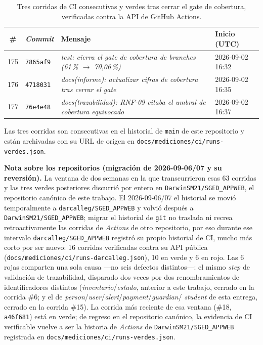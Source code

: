 \documentclass[11pt,a4paper]{article}
\newcommand{\ruta}[1]{\texttt{\footnotesize #1}}
\begin{document}
\begin{table}[htbp]
\centering
\caption{Tres corridas de CI consecutivas y verdes tras cerrar el gate de cobertura, verificadas contra la API de GitHub Actions.}
\label{tab:ci-corridas}
\begin{tabular}{@{}cp{2.1cm}p{6.8cm}p{3.3cm}@{}}
\toprule
\textbf{\#} & \textbf{\emph{Commit}} & \textbf{Mensaje} & \textbf{Inicio (UTC)} \\
\midrule
175 & \texttt{7865af9} & \emph{test: cierra el gate de cobertura de branches (61\,\% $\to$ 70,06\,\%)} & 2026-09-02 16:32 \\
176 & \texttt{4718031} & \emph{docs(informe): actualizar cifras de cobertura tras cerrar el gate} & 2026-09-02 16:35 \\
177 & \texttt{76e4e48} & \emph{docs(trazabilidad): RNF-09 citaba el umbral de cobertura equivocado} & 2026-09-02 16:37 \\
\bottomrule
\end{tabular}
\end{table}

Las tres corridas son consecutivas en el historial de \texttt{main} de
este repositorio y están archivadas con su URL de origen en
\ruta{docs/mediciones/ci/runs-verdes.json}.

\textbf{Nota sobre los repositorios (migración de 2026-09-06/07 y su
reversión).} La ventana de dos semanas en la que transcurrieron esas 63
corridas y las tres verdes posteriores discurrió por entero en
\texttt{DarwinSM21/SGED\_APPWEB}, el repositorio canónico de este
trabajo. El 2026-09-06/07 el historial se movió temporalmente a
\texttt{darcalleg/SGED\_APPWEB} y volvió después a
\texttt{DarwinSM21/SGED\_APPWEB}; migrar el historial de \texttt{git}
no traslada ni recrea retroactivamente las corridas de \emph{Actions}
de otro repositorio, por eso durante ese intervalo
\texttt{darcalleg/SGED\_APPWEB} registró su propio historial de CI,
mucho más corto por ser nuevo: 16 corridas verificadas contra su API
pública (\ruta{docs/mediciones/ci/runs-darcalleg.json}), 10 en
verde y 6 en rojo. Las 6 rojas comparten una sola causa —no seis
defectos distintos—: el mismo \emph{step} de validación de
trazabilidad, disparado dos veces por dos renombramientos de
identificadores distintos (\emph{inventario}/\emph{estado}, anterior a
este trabajo, cerrado en la corrida \#6; y el de
\emph{person}/\emph{user}/\emph{alert}/\emph{payment}/\emph{guardian}/
\emph{student} de esta entrega, cerrado en la corrida \#15). La corrida
más reciente de esa ventana (\#18, \texttt{a46f681}) está en verde; de
regreso en el repositorio canónico, la evidencia de CI verificable
vuelve a ser la historia de \emph{Actions} de
\texttt{DarwinSM21/SGED\_APPWEB} registrada en
\ruta{docs/mediciones/ci/runs-verdes.json}.
\end{document}
